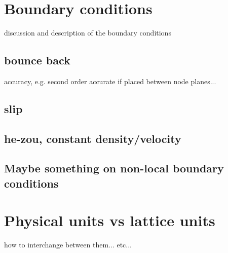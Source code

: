 \section{Boundary conditions}
discussion and description of the boundary conditions
\subsection{bounce back}
accuracy, e.g. second order accurate if placed between node planes...
\subsection{slip}
\subsection{he-zou, constant density/velocity}
\subsection{Maybe something on non-local boundary conditions}

\section{Physical units vs lattice units}
how to interchange between them... etc...

\section{}
